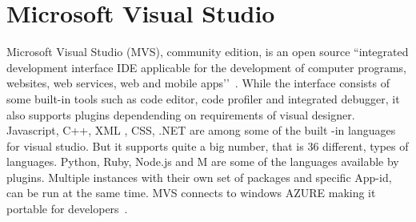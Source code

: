 \section{Microsoft Visual Studio}

Microsoft Visual Studio (MVS), community edition, is an open source ``integrated
development interface IDE applicable for the development of computer programs, 
websites, web services, web and mobile apps’’~\cite{hid-sp18-415-wikipedia-org}. While 
the interface consists of some built-in tools such as code editor, code profiler
and integrated debugger, it also supports plugins dependending on  requirements 
of visual designer. Javascript, C++, XML , CSS, .NET are among some of the 
built -in languages for visual studio. But it supports quite a big number, 
that is 36 different, types of languages. Python, Ruby, Node.js and M are 
some of the languages available by plugins.  Multiple instances with their own
set of packages and specific App-id, can be run at the same time. MVS 
connects to windows AZURE making it portable for
developers~\cite{hid-sp18-415-wikipedia-org}.

